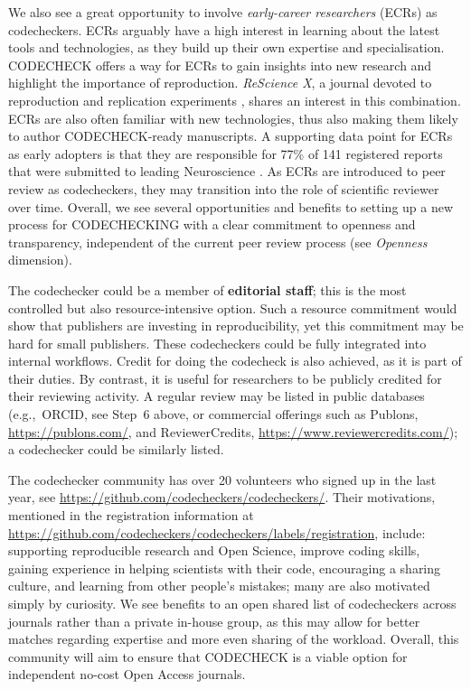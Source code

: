 \documentclass[12pt]{article}
\begin{document}
We also see a great opportunity to involve \emph{early-career researchers} (ECRs) as codecheckers.
ECRs arguably have a high interest in learning
about the latest tools and technologies, as they build up their own
expertise and specialisation.
CODECHECK offers a way for ECRs to gain insights into new research and
highlight the importance of reproduction.  
\emph{ReScience X}, a journal devoted to reproduction and replication experiments \cite{roesch_new_2020}, shares an interest in this combination.
ECRs are also often familiar with new technologies, thus also making them likely to author CODECHECK-ready manuscripts.
A supporting data point for ECRs as early adopters is that they are responsible for 77\% of 141 registered reports that were submitted to leading Neuroscience \cite{chambers_registered_2019}.
As ECRs are introduced to peer review as codecheckers, they may transition into the role of scientific reviewer over time.
Overall, we see several opportunities and benefits to setting up a new process for CODECHECKING with a clear commitment to openness and transparency, independent of the current peer review process (see \emph{Openness} dimension).

The codechecker could be a member of \textbf{editorial staff}; this is
the most controlled but also resource-intensive option.  Such a
resource commitment would show that publishers are investing in
reproducibility, yet this commitment may be hard for small publishers.
These codecheckers could be fully integrated into internal workflows.
Credit for doing the codecheck is also achieved, as it is part of
their duties.  By contrast, it is useful for researchers to be
publicly credited for their reviewing activity.  A regular review
may be listed in public databases (e.g.,~ORCID, see Step~6 above,
or commercial offerings such as Publons, \url{https://publons.com/}, and
ReviewerCredits, \url{https://www.reviewercredits.com/});
a codechecker could be similarly listed.

The codechecker community has over 20 volunteers who signed up in the last
year, see \url{https://github.com/codecheckers/codecheckers/}.  Their
motivations, mentioned in the registration
information at \url{https://github.com/codecheckers/codecheckers/labels/registration},
include: supporting reproducible research and Open Science, improve
coding skills, gaining experience in helping scientists with their
code, encouraging a sharing culture, and learning from other people's
mistakes; many are also motivated simply by curiosity.  We see
benefits to an open shared list of codecheckers across journals rather
than a private in-house group, as this may allow for better matches
regarding expertise and more even sharing of the workload.  Overall,
this community will aim to ensure that CODECHECK is a viable option
for independent no-cost Open Access journals.
\end{document}
